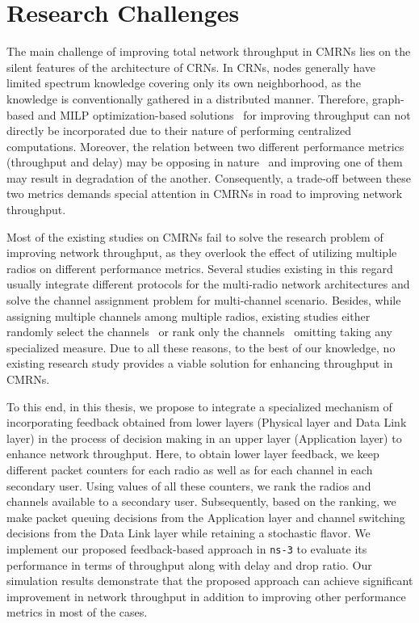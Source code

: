\section{Research Challenges}
The main challenge of improving total network throughput in CMRNs lies on the silent features of the architecture of CRNs. In CRNs, nodes generally have limited spectrum knowledge covering only its own neighborhood, as the knowledge is conventionally gathered in a distributed manner. Therefore, graph-based and MILP optimization-based solutions~\cite{hoang2008downlink,ahmed2014channel} for improving throughput can not directly be incorporated due to their nature of performing centralized computations. Moreover, the relation between two different performance metrics (throughput and delay) may be opposing in nature~\cite{gamal2004throughput} and improving one of them may result in degradation of the another. Consequently, a trade-off between these two metrics demands special attention in CMRNs in road to improving network throughput.

Most of the existing studies on CMRNs fail to solve the research problem of improving network throughput, as they overlook the effect of utilizing multiple radios on different performance metrics. Several studies existing in this regard~\cite{de2012survey, feng2009joint, zhong2014capacity, li2014deterministic} usually integrate different protocols for the multi-radio network architectures and solve the channel assignment problem for multi-channel scenario. Besides, while assigning multiple channels among multiple radios, existing studies either randomly select the channels~\cite{khan2015towards} or rank only the channels~\cite{zhong2014capacity} omitting taking any specialized measure. Due to all these reasons, to the best of our knowledge, no existing research study provides a viable solution for enhancing throughput in CMRNs.

To this end, in this thesis, we propose to integrate a specialized mechanism of incorporating feedback obtained from lower layers (Physical layer and Data Link layer) in the process of decision making in an upper layer (Application layer) to enhance network throughput. Here, to obtain lower layer feedback, we keep different packet counters for each radio as well as for each channel in each secondary user. Using values of all these counters, we rank the radios and channels available to a secondary user. Subsequently, based on the ranking, we make packet queuing decisions from the Application layer and channel switching decisions from the Data Link layer while retaining a stochastic flavor. We implement our proposed feedback-based approach in \texttt{ns-3} to evaluate its performance in terms of throughput along with delay and drop ratio. Our simulation results demonstrate that the proposed approach can achieve significant improvement in network throughput in addition to improving other performance metrics in most of the cases.

